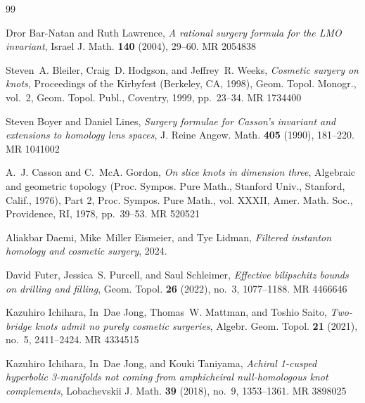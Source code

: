 \documentclass{amsart}
\theoremstyle{remark}
\begin{document}
\providecommand{\bysame}{\leavevmode\hbox to3em{\hrulefill}\thinspace}
\providecommand{\MR}{\relax\ifhmode\unskip\space\fi MR }
\providecommand{\MRhref}[2]{%
  \href{http://www.ams.org/mathscinet-getitem?mr=#1}{#2}
}
\begin{thebibliography}{99}

Dror Bar-Natan and Ruth Lawrence, \emph{A rational surgery formula for the {LMO} invariant}, Israel J. Math. \textbf{140} (2004), 29--60. \MR{2054838}

Steven~A. Bleiler, Craig~D. Hodgson, and Jeffrey~R. Weeks, \emph{Cosmetic surgery on knots}, Proceedings of the {K}irbyfest ({B}erkeley, {CA}, 1998), Geom. Topol. Monogr., vol.~2, Geom. Topol. Publ., Coventry, 1999, pp.~23--34. \MR{1734400}

Steven Boyer and Daniel Lines, \emph{Surgery formulae for {C}asson's invariant and extensions to homology lens spaces}, J. Reine Angew. Math. \textbf{405} (1990), 181--220. \MR{1041002}

A.~J. Casson and C.~McA. Gordon, \emph{On slice knots in dimension three}, Algebraic and geometric topology ({P}roc. {S}ympos. {P}ure {M}ath., {S}tanford {U}niv., {S}tanford, {C}alif., 1976), {P}art 2, Proc. Sympos. Pure Math., vol. XXXII, Amer. Math. Soc., Providence, RI, 1978, pp.~39--53. \MR{520521}

Aliakbar Daemi, Mike~Miller Eismeier, and Tye Lidman, \emph{Filtered instanton homology and cosmetic surgery}, 2024.

David Futer, Jessica~S. Purcell, and Saul Schleimer, \emph{Effective bilipschitz bounds on drilling and filling}, Geom. Topol. \textbf{26} (2022), no.~3, 1077--1188. \MR{4466646}

Kazuhiro Ichihara, In~Dae Jong, Thomas~W. Mattman, and Toshio Saito, \emph{Two-bridge knots admit no purely cosmetic surgeries}, Algebr. Geom. Topol. \textbf{21} (2021), no.~5, 2411--2424. \MR{4334515}

Kazuhiro Ichihara, In~Dae Jong, and Kouki Taniyama, \emph{Achiral 1-cusped hyperbolic 3-manifolds not coming from amphicheiral null-homologous knot complements}, Lobachevskii J. Math. \textbf{39} (2018), no.~9, 1353--1361. \MR{3898025}


\end{thebibliography}
\end{document}
